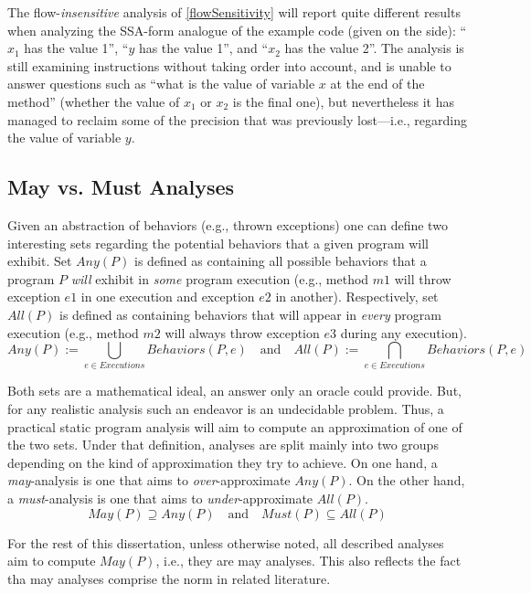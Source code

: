 The flow-\emph{insensitive} analysis of \ref{flowSensitivity} will report quite
different results when analyzing the SSA-form analogue of the example code
(given on the side): ``$x_1$ has the value 1'', ``$y$ has the value 1'', and
``$x_2$ has the value 2''. The analysis is still examining instructions without
taking order into account, and is unable to answer questions such as ``what is
the value of variable $x$ at the end of the method'' (whether the value of
$x_1$ or $x_2$ is the final one), but nevertheless it has managed to reclaim
some of the precision that was previously lost---i.e., regarding the value of
variable $y$.


\subsection{May vs. Must Analyses}

Given an abstraction of behaviors (e.g., thrown exceptions) one can define two
interesting sets regarding the potential behaviors that a given program will
exhibit. Set $Any(P)$ is defined as containing all possible behaviors that a
program $P$ \emph{will} exhibit in \emph{some} program execution (e.g., method
$m1$ will throw exception $e1$ in one execution and exception $e2$ in another).
Respectively, set $All(P)$ is defined as containing behaviors that will appear
in \emph{every} program execution (e.g., method $m2$ will always throw
exception $e3$ during any execution). %
\[
Any(P) := \bigcup_{e \in Executions} Behaviors(P, e)
\quad \textrm{and} \quad
All(P) := \bigcap_{e \in Executions} Behaviors(P, e)
\]

Both sets are a mathematical ideal, an answer only an oracle could provide.
But, for any realistic analysis such an endeavor is an undecidable problem.
Thus, a practical static program analysis will aim to compute an approximation
of one of the two sets. Under that definition, analyses are split mainly into
two groups depending on the kind of approximation they try to achieve. On one
hand, a \emph{may}-analysis is one that aims to \emph{over}-approximate
$Any(P)$. On the other hand, a \emph{must}-analysis is one that aims to
\emph{under}-approximate $All(P)$. %
\[
May(P) \supseteq Any(P) \quad \textrm{and} \quad Must(P) \subseteq All(P)
\]

For the rest of this dissertation, unless otherwise noted, all described analyses
aim to compute $May(P)$, i.e., they are may analyses. This also reflects the fact
tha may analyses comprise the norm in related literature.


